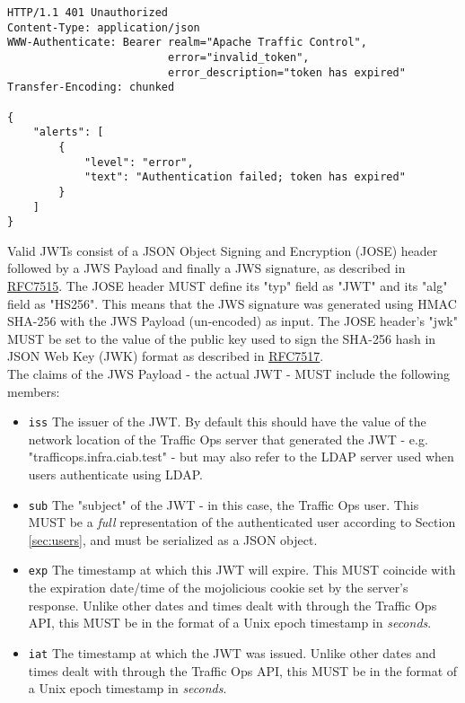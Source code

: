 \documentclass{article}
\newenvironment{codelisting}{\captionsetup{type=listing}}{}
\newcommand{\code}[1]{\texttt{\color{inlinecodecolor}#1}}
\begin{document}
\begin{codelisting}
\label{code:expired-token}
\begin{verbatim}
HTTP/1.1 401 Unauthorized
Content-Type: application/json
WWW-Authenticate: Bearer realm="Apache Traffic Control",
                         error="invalid_token",
                         error_description="token has expired"
Transfer-Encoding: chunked

{
	"alerts": [
		{
			"level": "error",
			"text": "Authentication failed; token has expired"
		}
	]
}
\end{verbatim}
\end{codelisting}

Valid JWTs consist of a JSON Object Signing and Encryption (JOSE) header followed by a JWS Payload and finally a JWS signature, as described
in \href{https://tools.ietf.org/html/rfc7515}{RFC7515}. The JOSE header MUST define its "typ" field as "JWT" and its "alg" field as "HS256".
This means that the JWS signature was generated using HMAC SHA-256 with the JWS Payload (un-encoded) as input. The JOSE header's "jwk" MUST be
set to the value of the public key used to sign the SHA-256 hash in JSON Web Key (JWK) format as described in
\href{https://tools.ietf.org/html/rfc7517}{RFC7517}.\\
The claims of the JWS Payload - the actual JWT - MUST include the following members:

\begin{itemize}
	\item \code{iss} The issuer of the JWT. By default this should have the value of the network location of the Traffic Ops server that
	generated the JWT - e.g. "trafficops.infra.ciab.test" - but may also refer to the LDAP server used when users authenticate using LDAP.
	\item \code{sub} The "subject" of the JWT - in this case, the Traffic Ops user. This MUST be a \emph{full} representation of the
	authenticated user according to Section \ref{sec:users}, and must be serialized as a JSON object.
	\item \code{exp} The timestamp at which this JWT will expire. This MUST coincide with the expiration date/time of the mojolicious
	cookie set by the server's response. Unlike other dates and times dealt with through the Traffic Ops API, this MUST be in the format of
	a Unix epoch timestamp in \emph{seconds}.
	\item \code{iat} The timestamp at which the JWT was issued. Unlike other dates and times dealt with through the Traffic Ops API, this
	MUST be in the format of a Unix epoch timestamp in \emph{seconds}.
\end{itemize}
\end{document}
